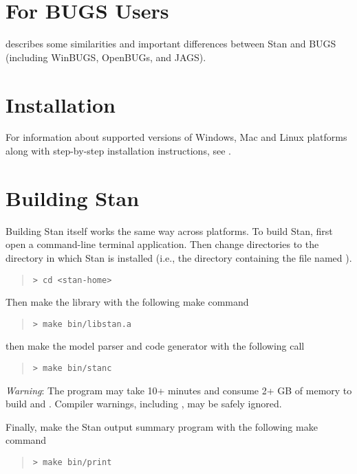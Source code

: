 \section{For BUGS Users}

 describes some similarities
and important differences between Stan and BUGS (including WinBUGS,
OpenBUGs, and JAGS).


\section{Installation}

For information about supported versions of Windows, Mac and Linux
platforms along with step-by-step installation instructions, see
.

\section{Building Stan}

Building Stan itself works the same way across platforms.
To build Stan, first open a command-line terminal application.  Then change
directories to the directory in which Stan is installed (i.e., the
directory containing the file named ).
%
\begin{quote}
\begin{Verbatim}[fontshape=sl,fontsize=\small] 
> cd <stan-home>
\end{Verbatim}
\end{quote}
%
Then make the library with the following make command
%
\begin{quote}
\begin{Verbatim}[fontshape=sl,fontsize=\small]
> make bin/libstan.a
\end{Verbatim}
\end{quote}
%
then make the model parser and code generator with the following call
%
\begin{quote}
\begin{Verbatim}[fontshape=sl,fontsize=\small]
> make bin/stanc
\end{Verbatim}
\end{quote}
%
\emph{Warning}: The  program may take 10+ minutes and
consume 2+ GB of memory to build  and .
Compiler warnings, including , may be safely ignored.
 
Finally, make the Stan output summary program with the following
make command
%
\begin{quote}
\begin{Verbatim}[fontshape=sl,fontsize=\small]
> make bin/print
\end{Verbatim}
\end{quote}
%

